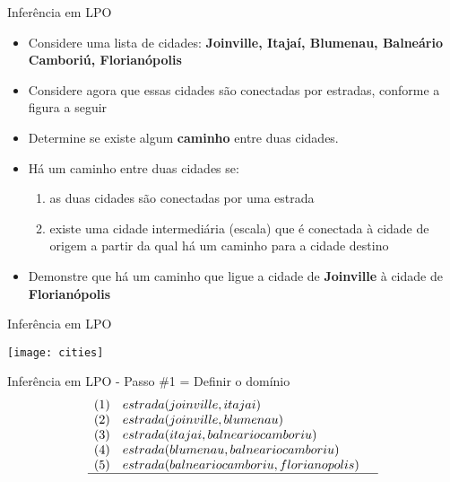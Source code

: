 \begin{frame}[t]{Inferência em LPO}	
	\begin{itemize}
	\item Considere uma lista de cidades: {\bf Joinville, Itajaí, Blumenau, Balneário Camboriú, Florianópolis}
	\item Considere agora que essas cidades são conectadas por estradas, conforme a figura a seguir
	\item Determine se existe algum {\bf caminho} entre duas cidades.

	\item Há um caminho entre duas cidades se:
	\begin{enumerate}
	\item as duas cidades são conectadas por uma estrada
	\item existe uma cidade intermediária (escala) que é conectada à cidade de origem a partir da qual há um caminho para a cidade destino
	\end{enumerate}

	\item Demonstre que há um caminho que ligue a cidade de {\bf Joinville} à cidade de {\bf Florianópolis}
	\end{itemize}
\end{frame}

\begin{frame}[t]{Inferência em LPO}	
	\begin{center}
	\texttt{[image: cities]}
	\end{center}
\end{frame}

\begin{frame}[t]{Inferência em LPO - Passo \#1 = Definir o domínio}	
	$$\begin{array}{lll}
	(1) & estrada(joinville, itajai) & \\
	(2) & estrada(joinville, blumenau) & \\
	(3) & estrada(itajai, balneariocamboriu) & \\
	(4) & estrada(blumenau, balneariocamboriu) & \\
	(5) & estrada(balneariocamboriu, florianopolis) & \\
	\hline
	\end{array}$$	
\end{frame}

